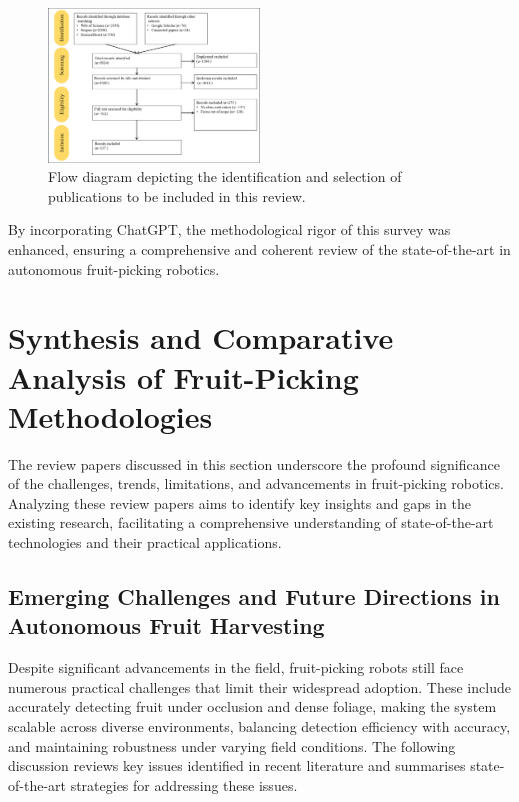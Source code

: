 \documentclass[a4paper,fleqn]{cas-dc}
\begin{document}
\begin{figure}[h!]
    \centering
    \includegraphics[width=0.5\textwidth]{fig_prisma1.png}
    \caption{Flow diagram depicting the identification and selection of publications to be included in this review.}
    \label{fig:struct}
\end{figure}

By incorporating ChatGPT, the methodological rigor of this survey was enhanced, ensuring a comprehensive and coherent review of the state-of-the-art in autonomous fruit-picking robotics.
\fi
\iffalse
\section{Synthesis and Comparative Analysis of Fruit-Picking Methodologies}
The review papers discussed in this section underscore the profound significance of the challenges, trends, limitations, and advancements in fruit-picking robotics. Analyzing these review papers aims to identify key insights and gaps in the existing research, facilitating a comprehensive understanding of state-of-the-art technologies and their practical applications.

\subsection{Emerging Challenges and Future Directions in Autonomous Fruit Harvesting}

Despite significant advancements in the field, fruit-picking robots still face numerous practical challenges that limit their widespread adoption. These include accurately detecting fruit under occlusion and dense foliage, making the system scalable across diverse environments, balancing detection efficiency with accuracy, and maintaining robustness under varying field conditions. The following discussion reviews key issues identified in recent literature and summarises state-of-the-art strategies for addressing these issues.
\end{document}

